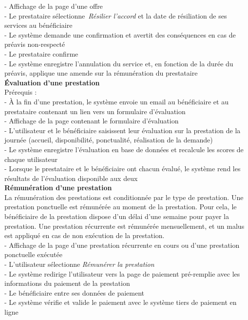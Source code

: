 \documentclass[conference]{IEEEtran}
\begin{document}
- Affichage de la page d'une offre\\
- Le prestataire sélectionne \textit{Résilier l'accord} et la date de résiliation de ses services au bénéficiaire\\
- Le système demande une confirmation et avertit des conséquences en cas de préavis non-respecté\\
- Le prestataire confirme\\
- Le système enregistre l'annulation du service et, en fonction de la durée du préavis, applique une amende sur la rémunération du prestataire\\

\textbf{Évaluation d'une prestation}\hfil\\
Prérequis :\\
- À la fin d'une prestation, le système envoie un email au bénéficiaire et au prestataire contenant un lien vers un formulaire d'évaluation\\

- Affichage de la page contenant le formulaire d'évaluation\\
- L'utilisateur et le bénéficiaire saisissent leur évaluation sur la prestation de la journée (accueil, disponibilité, ponctualité, réalisation de la demande)\\
- Le système enregistre l'évaluation en base de données et recalcule les scores de chaque utilisateur\\
- Lorsque le prestataire et le bénéficiaire ont chacun évalué, le système rend les résultats de l'évaluation disponible aux deux\\

\textbf{Rémunération d'une prestation}\\
La rémunération des prestations est conditionnée par le type de prestation. Une prestation ponctuelle est rémunérée au moment de la prestation. Pour cela, le bénéficiaire de la prestation dispose d'un délai d'une semaine pour payer la prestation. Une prestation récurrente est rémunérée mensuellement, et un malus est appliqué en cas de non exécution de la prestation.\\

- Affichage de la page d'une prestation récurrente en cours ou d'une prestation ponctuelle exécutée\\
- L'utilisateur sélectionne \textit{Rémunérer la prestation}\\
- Le système redirige l'utilisateur vers la page de paiement pré-remplie avec les informations du paiement de la prestation\\
- Le bénéficiaire entre ses données de paiement\\
- Le système vérifie et valide le paiement avec le système tiers de paiement en ligne\\
\end{document}

